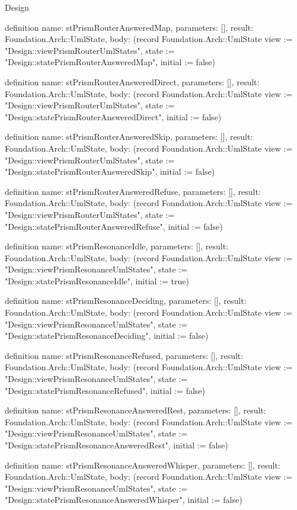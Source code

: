 \begin{lexlean}{Design}
\begin{semanticmodule}
definition{
  name: stPrismRouterAnsweredMap,
  parameters: [],
  result: Foundation.Arch::UmlState,
  body: (record Foundation.Arch::UmlState {view := "Design::viewPrismRouterUmlStates", state := "Design::statePrismRouterAnsweredMap", initial := false})
}

definition{
  name: stPrismRouterAnsweredDirect,
  parameters: [],
  result: Foundation.Arch::UmlState,
  body: (record Foundation.Arch::UmlState {view := "Design::viewPrismRouterUmlStates", state := "Design::statePrismRouterAnsweredDirect", initial := false})
}

definition{
  name: stPrismRouterAnsweredSkip,
  parameters: [],
  result: Foundation.Arch::UmlState,
  body: (record Foundation.Arch::UmlState {view := "Design::viewPrismRouterUmlStates", state := "Design::statePrismRouterAnsweredSkip", initial := false})
}

definition{
  name: stPrismRouterAnsweredRefuse,
  parameters: [],
  result: Foundation.Arch::UmlState,
  body: (record Foundation.Arch::UmlState {view := "Design::viewPrismRouterUmlStates", state := "Design::statePrismRouterAnsweredRefuse", initial := false})
}

definition{
  name: stPrismResonanceIdle,
  parameters: [],
  result: Foundation.Arch::UmlState,
  body: (record Foundation.Arch::UmlState {view := "Design::viewPrismResonanceUmlStates", state := "Design::statePrismResonanceIdle", initial := true})
}

definition{
  name: stPrismResonanceDeciding,
  parameters: [],
  result: Foundation.Arch::UmlState,
  body: (record Foundation.Arch::UmlState {view := "Design::viewPrismResonanceUmlStates", state := "Design::statePrismResonanceDeciding", initial := false})
}

definition{
  name: stPrismResonanceRefused,
  parameters: [],
  result: Foundation.Arch::UmlState,
  body: (record Foundation.Arch::UmlState {view := "Design::viewPrismResonanceUmlStates", state := "Design::statePrismResonanceRefused", initial := false})
}

definition{
  name: stPrismResonanceAnsweredRest,
  parameters: [],
  result: Foundation.Arch::UmlState,
  body: (record Foundation.Arch::UmlState {view := "Design::viewPrismResonanceUmlStates", state := "Design::statePrismResonanceAnsweredRest", initial := false})
}

definition{
  name: stPrismResonanceAnsweredWhisper,
  parameters: [],
  result: Foundation.Arch::UmlState,
  body: (record Foundation.Arch::UmlState {view := "Design::viewPrismResonanceUmlStates", state := "Design::statePrismResonanceAnsweredWhisper", initial := false})
}


\end{semanticmodule}
\end{lexlean}
